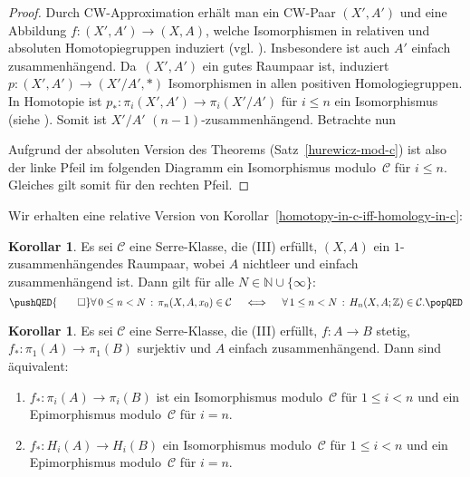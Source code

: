 \documentclass[11pt, a4paper, german]{article}
\theoremstyle{definition}
\newtheorem{kor}[lem]{Korollar}
\theoremstyle{remark}
\newcommand{\N}{\mathbb{N}} %
\newcommand{\Z}{\mathbb{Z}} %
\newcommand{\fa}[1]{\forall \, {#1} \,:\,}
\newcommand{\SC}{\mathcal{C}} %
\begin{document}
\begin{proof}
  Durch CW-Approximation erhält man ein CW-Paar $(X', A')$ und eine Abbildung $f : (X', A') \to (X, A)$, welche Isomorphismen in relativen und absoluten Homotopiegruppen induziert (vgl. \cite[\mbox{} Ex 4.14]{hatcher:at}).
  Insbesondere ist auch $A'$ einfach zusammenhängend.
  Da~$(X', A')$ ein gutes Raumpaar ist, induziert $p : (X', A') \to (X'/A', *)$ Isomorphismen in allen positiven Homologiegruppen.
  In Homotopie ist $p_* : \pi_i(X', A') \to \pi_i(X'/A')$ für $i \leq n$ ein Isomorphismus (siehe \cite[\mbox{} Prop 4.28]{hatcher:at}).
  Somit ist $X'/A'$ $(n {-} 1)$-zusammenhängend.
  Betrachte nun
  \begin{center}
  \end{center}
  Aufgrund der absoluten Version des Theorems (Satz~\ref{hurewicz-mod-c}) ist also der linke Pfeil im folgenden Diagramm ein Isomorphismus modulo~$\SC$ für $i \leq n$.
  Gleiches gilt somit für den rechten Pfeil.
\end{proof}

Wir erhalten eine relative Version von Korollar~\ref{homotopy-in-c-iff-homology-in-c}:

\begin{kor}\label{homotopy-in-c-iff-homology-in-c-relative}
  Es sei $\SC$ eine Serre-Klasse, die (III) erfüllt, $(X, A)$ ein $1$-zusammenhängendes Raumpaar, wobei $A$ nichtleer und einfach zusammenhängend ist.
  Dann gilt für alle $N \in \N \cup \{ \infty \}$:
  \[
    \pushQED{\qed} 
    \fa{0 \leq n < N} \pi_n(X, A, x_0) \in \SC
    \quad \iff \quad
    \fa{1 \leq n < N} H_n(X, A; \Z) \in \SC.
    \qedhere
    \popQED
  \]
\end{kor}

\begin{kor}\label{homotopy-homology-equivalence-mod-c}
  Es sei $\SC$ eine Serre-Klasse, die (III) erfüllt, $f : A \to B$ stetig, $f_* : \pi_1(A) \to \pi_1(B)$ surjektiv und $A$ einfach zusammenhängend.
  Dann sind äquivalent:
  \begin{enumerate}[label=(\alph*)]
    \item $f_* : \pi_i(A) \to \pi_i(B)$ ist ein Isomorphismus modulo~$\SC$ für $1 \leq i < n$ und ein Epimorphismus modulo~$\SC$ für $i = n$.
    \item $f_* : H_i(A) \to H_i(B)$ ein Isomorphismus modulo~$\SC$ für $1 \leq i < n$ und ein Epimorphismus modulo~$\SC$ für $i = n$.
  \end{enumerate}
\end{kor}
\end{document}
